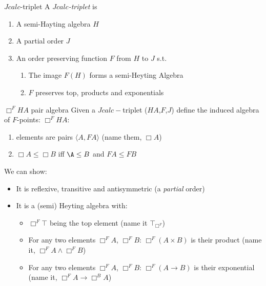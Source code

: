\documentclass{beamer}
\begin{document}
 \begin{frame}{$Jcalc$-triplet}
    A \emph{$Jcalc$-triplet} is 
    
  \begin{enumerate}
  \item A semi-Hayting algebra $H$
  \item A partial order $J$
  \item An order preserving function $F$ from $H$ to $J$ s.t.
  \begin{enumerate}
    \item The image $F(H)$ forms a semi-Heyting Algebra
    \item $F$ preserves top, products and exponentials
  \end{enumerate}
  \end{enumerate}
\end{frame}
\begin{frame}{$\Box^F HA$ pair algebra}
Given a $Jcalc-$triplet ($HA$,$F$,$J$)  define the induced algebra of $F$-points:
$\Box^F HA$:
\begin{enumerate}
\item elements are pairs  $\langle A,FA\rangle$ (name them, $\Box A$)
\item $\Box A\le \Box B$ iff $\A\le B$ and $FA\le FB$ 
\end{enumerate}
We can show:
\begin{itemize}
  \item It is reflexive, transitive and antisymmetric (a \textit{partial} order)
  \item It is a (semi) Heyting algebra with:
  \begin{itemize}
    \item $\Box^F \top$ being the top element (name it $\top_{\Box^F}$)
    \item For any two elements $\Box^F A$, $\Box^F B$: 
    $\Box^F (A\times B)$ is their product (name it, $\Box^{F} A\wedge\Box^{F} B$)
    \item For any two elements $\Box^F A$, $\Box^F B$:
    $\Box^F (A\rightarrow B)$ is their exponential 
    (name it, $\Box^F A\rightarrow\Box^B A$)
  \end{itemize}
\end{itemize}
\end{frame}
\end{document}
